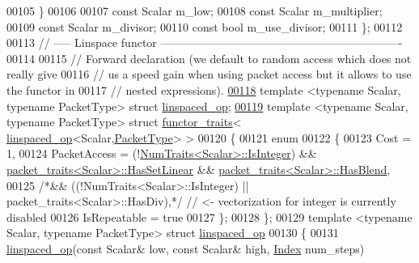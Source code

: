 \begin{DoxyCode}
00105   \}
00106 
00107   \textcolor{keyword}{const} Scalar m\_low;
00108   \textcolor{keyword}{const} Scalar m\_multiplier;
00109   \textcolor{keyword}{const} Scalar m\_divisor;
00110   \textcolor{keyword}{const} \textcolor{keywordtype}{bool} m\_use\_divisor;
00111 \};
00112 
00113 \textcolor{comment}{// ----- Linspace functor ----------------------------------------------------------------}
00114 
00115 \textcolor{comment}{// Forward declaration (we default to random access which does not really give}
00116 \textcolor{comment}{// us a speed gain when using packet access but it allows to use the functor in}
00117 \textcolor{comment}{// nested expressions).}
\hyperlink{struct_eigen_1_1internal_1_1linspaced__op}{00118} \textcolor{keyword}{template} <\textcolor{keyword}{typename} Scalar, \textcolor{keyword}{typename} PacketType> \textcolor{keyword}{struct }\hyperlink{struct_eigen_1_1internal_1_1linspaced__op}{linspaced\_op};
\hyperlink{struct_eigen_1_1internal_1_1functor__traits_3_01linspaced__op_3_01_scalar_00_01_packet_type_01_4_01_4}{00119} \textcolor{keyword}{template} <\textcolor{keyword}{typename} Scalar, \textcolor{keyword}{typename} PacketType> \textcolor{keyword}{struct }\hyperlink{struct_eigen_1_1internal_1_1functor__traits}{functor\_traits}< 
      \hyperlink{struct_eigen_1_1internal_1_1linspaced__op}{linspaced\_op}<Scalar,\hyperlink{struct_eigen_1_1_packet_type}{PacketType}> >
00120 \{
00121   \textcolor{keyword}{enum}
00122   \{
00123     Cost = 1,
00124     PacketAccess =   (!\hyperlink{group___core___module_struct_eigen_1_1_num_traits}{NumTraits<Scalar>::IsInteger}) && 
      \hyperlink{struct_eigen_1_1internal_1_1packet__traits}{packet\_traits<Scalar>::HasSetLinear} && 
      \hyperlink{struct_eigen_1_1internal_1_1packet__traits}{packet\_traits<Scalar>::HasBlend},
00125                   \textcolor{comment}{/*&& ((!NumTraits<Scalar>::IsInteger) || packet\_traits<Scalar>::HasDiv),*/} \textcolor{comment}{// <-
       vectorization for integer is currently disabled}
00126     IsRepeatable = \textcolor{keyword}{true}
00127   \};
00128 \};
00129 \textcolor{keyword}{template} <\textcolor{keyword}{typename} Scalar, \textcolor{keyword}{typename} PacketType> \textcolor{keyword}{struct }\hyperlink{struct_eigen_1_1internal_1_1linspaced__op}{linspaced\_op}
00130 \{
00131   \hyperlink{struct_eigen_1_1internal_1_1linspaced__op}{linspaced\_op}(\textcolor{keyword}{const} Scalar& low, \textcolor{keyword}{const} Scalar& high, \hyperlink{namespace_eigen_a62e77e0933482dafde8fe197d9a2cfde}{Index} num\_steps)

\end{DoxyCode}
